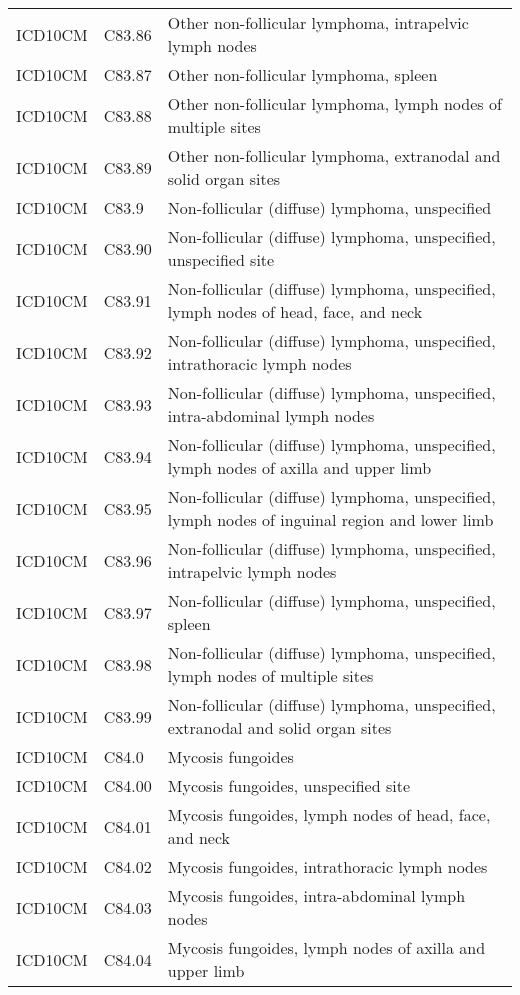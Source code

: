 \begin{longtable}{p{}p{}p{}}
  ICD10CM & C83.86 & Other non-follicular lymphoma, intrapelvic lymph nodes \\ 
  ICD10CM & C83.87 & Other non-follicular lymphoma, spleen \\ 
  ICD10CM & C83.88 & Other non-follicular lymphoma, lymph nodes of multiple sites \\ 
  ICD10CM & C83.89 & Other non-follicular lymphoma, extranodal and solid organ sites \\ 
  ICD10CM & C83.9 & Non-follicular (diffuse) lymphoma, unspecified \\ 
  ICD10CM & C83.90 & Non-follicular (diffuse) lymphoma, unspecified, unspecified site \\ 
  ICD10CM & C83.91 & Non-follicular (diffuse) lymphoma, unspecified, lymph nodes of head, face, and neck \\ 
  ICD10CM & C83.92 & Non-follicular (diffuse) lymphoma, unspecified, intrathoracic lymph nodes \\ 
  ICD10CM & C83.93 & Non-follicular (diffuse) lymphoma, unspecified, intra-abdominal lymph nodes \\ 
  ICD10CM & C83.94 & Non-follicular (diffuse) lymphoma, unspecified, lymph nodes of axilla and upper limb \\ 
  ICD10CM & C83.95 & Non-follicular (diffuse) lymphoma, unspecified, lymph nodes of inguinal region and lower limb \\ 
  ICD10CM & C83.96 & Non-follicular (diffuse) lymphoma, unspecified, intrapelvic lymph nodes \\ 
  ICD10CM & C83.97 & Non-follicular (diffuse) lymphoma, unspecified, spleen \\ 
  ICD10CM & C83.98 & Non-follicular (diffuse) lymphoma, unspecified, lymph nodes of multiple sites \\ 
  ICD10CM & C83.99 & Non-follicular (diffuse) lymphoma, unspecified, extranodal and solid organ sites \\ 
  ICD10CM & C84.0 & Mycosis fungoides \\ 
  ICD10CM & C84.00 & Mycosis fungoides, unspecified site \\ 
  ICD10CM & C84.01 & Mycosis fungoides, lymph nodes of head, face, and neck \\ 
  ICD10CM & C84.02 & Mycosis fungoides, intrathoracic lymph nodes \\ 
  ICD10CM & C84.03 & Mycosis fungoides, intra-abdominal lymph nodes \\ 
  ICD10CM & C84.04 & Mycosis fungoides, lymph nodes of axilla and upper limb \\ 

\end{longtable}
